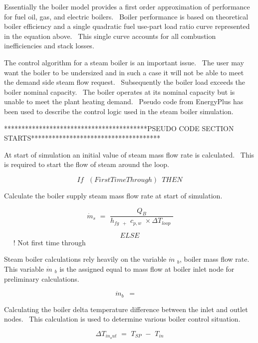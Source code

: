 Essentially the boiler model provides a first order approximation of performance for fuel oil, gas, and electric boilers.~ Boiler performance is based on theoretical boiler efficiency and a single quadratic fuel use-part load ratio curve represented in the equation above.~ This single curve accounts for all combustion inefficiencies and stack losses.

The control algorithm for a steam boiler is an important issue.~ The user may want the boiler to be undersized and in such a case it will not be able to meet the demand side steam flow request.~ Subsequently the boiler load exceeds the boiler nominal capacity.~ The boiler operates at its nominal capacity but is unable to meet the plant heating demand.~ Pseudo code from EnergyPlus has been used to describe the control logic used in the steam boiler simulation.

*****************************************PSEUDO CODE SECTION STARTS*************************************

At start of simulation an initial value of steam mass flow rate is calculated.~ This is required to start the flow of steam around the loop.

\begin{equation}
If\,\,\,\,(FirstTimeThrough)\,\,\,THEN
\end{equation}

Calculate the boiler supply steam mass flow rate at start of simulation.

\begin{equation}
\,{\dot m_s}\,\, = \,\,\frac{{{Q_B}}}{{{h_{fg\,\,\, + }}\,\,{c_{p,w}}\,\, \times \Delta {T_{loop}}\,\,}}
\end{equation}

\[ELSE\] ~~ ! Not first time through

Steam boiler calculations rely heavily on the variable \(\dot m\) \(_{b}\), boiler mass flow rate.~ This variable \(\dot m\) \(_{b}\) is the assigned equal to mass flow at boiler inlet node for preliminary calculations.

\begin{equation}
\,{\dot m_b}\,\,\, = \,\,\,\mathop {\,{{\dot m}_{Inlet_Node}}}\limits^{}
\end{equation}

Calculating the boiler delta temperature difference between the inlet and outlet nodes.~ This calculation is used to determine various boiler control situation.

\begin{equation}
\Delta {T_{in_out}}\,\, = \,\,{T_{SP}}\,\, - \,\,{T_{in}}
\end{equation}

